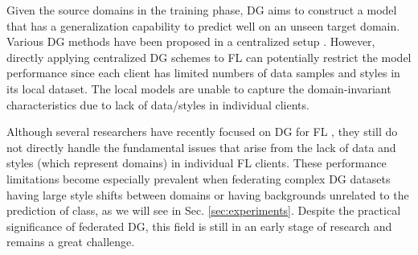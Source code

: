 \documentclass{article}
\theoremstyle{plain}
\theoremstyle{definition}
\theoremstyle{remark}
\begin{document}
Given the source domains in the training phase, DG aims to construct a model that has a generalization capability to predict well on an unseen target domain.
Various DG methods have been proposed in a centralized setup \cite{zhou2021domain,li2022uncertainty,zhang2022exact,zhou2020learning,li2019episodic,li2018learning,li2018deep,li2018domaincc}.  
However, directly applying centralized DG schemes to FL can potentially restrict the model performance since each client has  limited numbers of data samples and styles in its local dataset. The local models are unable to capture the domain-invariant characteristics due to lack of data/styles in individual clients.%
  
 \vspace{-0.2mm}

Although several researchers have recently focused on DG  for  FL  \cite{liu2021feddg, chen2023federated, wu2021collaborative, nguyen2022fedsr},  they still do not directly handle the fundamental issues that arise from the lack of data and styles (which  represent domains) in individual FL clients. These performance limitations become especially prevalent when federating complex DG datasets having large style shifts between domains or having backgrounds unrelated to the prediction of class, as we will see in Sec. \ref{sec:experiments}. Despite the practical significance of federated DG, this field is still in an early stage of research and remains a great challenge.
  
 
 
\end{document}
